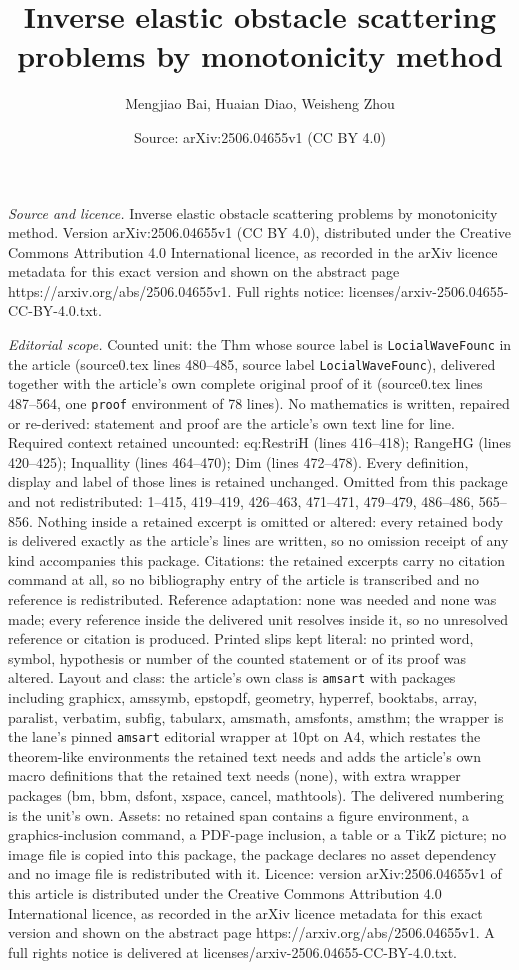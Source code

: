 \documentclass[10pt,a4paper]{amsart}
\title[Inverse elastic obstacle scattering problems by monotonicity]{Inverse elastic obstacle scattering problems by monotonicity method}
\author{Mengjiao Bai, Huaian Diao, Weisheng Zhou}
\date{Source: arXiv:2506.04655v1 (CC BY 4.0)}
\begin{document}
\maketitle

\noindent\emph{Source and licence.} Inverse elastic obstacle scattering problems by monotonicity method. Version arXiv:2506.04655v1 (CC BY 4.0), distributed under the Creative Commons Attribution 4.0 International licence, as recorded in the arXiv licence metadata for this exact version and shown on the abstract page https://arxiv.org/abs/2506.04655v1. Full rights notice: licenses/arxiv-2506.04655-CC-BY-4.0.txt.\par\smallskip

\noindent\textit{Editorial scope.} Counted unit: the Thm whose source label is \texttt{LocialWaveFounc} in the article (source0.tex lines 480--485, source label \texttt{LocialWaveFounc}), delivered together with the article's own complete original proof of it (source0.tex lines 487--564, one \texttt{proof} environment of 78 lines). No mathematics is written, repaired or re-derived: statement and proof are the article's own text line for line. Required context retained uncounted: eq:RestriH (lines 416--418); RangeHG (lines 420--425); Inquallity (lines 464--470); Dim (lines 472--478). Every definition, display and label of those lines is retained unchanged. Omitted from this package and not redistributed: 1--415, 419--419, 426--463, 471--471, 479--479, 486--486, 565--856. Nothing inside a retained excerpt is omitted or altered: every retained body is delivered exactly as the article's lines are written, so no omission receipt of any kind accompanies this package. Citations: the retained excerpts carry no citation command at all, so no bibliography entry of the article is transcribed and no reference is redistributed. Reference adaptation: none was needed and none was made; every reference inside the delivered unit resolves inside it, so no unresolved reference or citation is produced. Printed slips kept literal: no printed word, symbol, hypothesis or number of the counted statement or of its proof was altered. Layout and class: the article's own class is \texttt{amsart} with packages including graphicx, amssymb, epstopdf, geometry, hyperref, booktabs, array, paralist, verbatim, subfig, tabularx, amsmath, amsfonts, amsthm; the wrapper is the lane's pinned \texttt{amsart} editorial wrapper at 10pt on A4, which restates the theorem-like environments the retained text needs and adds the article's own macro definitions that the retained text needs (none), with extra wrapper packages (bm, bbm, dsfont, xspace, cancel, mathtools). The delivered numbering is the unit's own. Assets: no retained span contains a figure environment, a graphics-inclusion command, a PDF-page inclusion, a table or a TikZ picture; no image file is copied into this package, the package declares no asset dependency and no image file is redistributed with it. Licence: version arXiv:2506.04655v1 of this article is distributed under the Creative Commons Attribution 4.0 International licence, as recorded in the arXiv licence metadata for this exact version and shown on the abstract page https://arxiv.org/abs/2506.04655v1. A full rights notice is delivered at licenses/arxiv-2506.04655-CC-BY-4.0.txt. 
\end{document}
